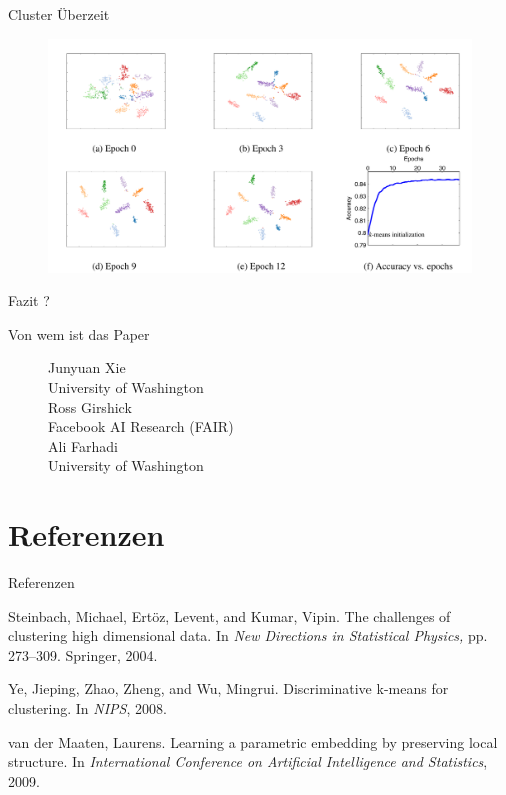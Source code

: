 \documentclass{beamer}
\begin{document}
\begin{frame}[t]{Cluster Überzeit}\vspace{4pt}
\begin{figure}
\center
\includegraphics[scale=0.35]{ClusterOverTime_tsne_plot.png}
\end{figure}
\end{frame}

\begin{frame}[t]{Fazit}\vspace{4pt}
?
\end{frame}

\begin{frame}[t]{Von wem ist das Paper}\vspace{30pt}
\begin{figure}
\center
\Large{Junyuan Xie}\\
University of Washington\\
\vspace{8pt}
\Large{Ross Girshick}\\
Facebook AI Research (FAIR)\\
\vspace{8pt}
\Large{Ali Farhadi}\\
University of Washington\\
\end{figure}
\end{frame}


\section{Referenzen}
\begin{frame}[t]{Referenzen}\vspace{4pt}
\begin{thebibliography}{10}
Steinbach, Michael, Ertöz, Levent, and Kumar, Vipin.
The challenges of clustering high dimensional data. In
\textit{New Directions in Statistical Physics,} pp. 273–309. Springer, 2004.

Ye, Jieping, Zhao, Zheng, and Wu, Mingrui. Discriminative k-means for clustering. In \textit{NIPS}, 2008.

van der Maaten, Laurens. Learning a parametric embedding by preserving local structure. In \textit{International Conference on Artificial Intelligence and Statistics}, 2009.
\end{thebibliography}
\end{frame}
\end{document}
